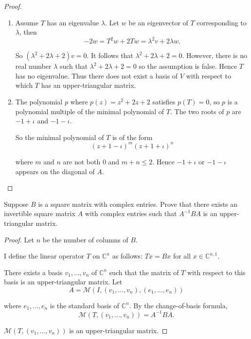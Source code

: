 \begin{proof}
    \begin{enumerate}[label={(\alph*)}]
        \item Assume $T$ has an eigenvalue $\lambda$. Let $w$ be an eigenvector of $T$ corresponding to $\lambda$, then
              \[
                  -2w = T^{2}w + 2Tw = \lambda^{2}v + 2\lambda w.
              \]

              So $(\lambda^{2} + 2\lambda + 2)v = 0$. It follows that $\lambda^{2} + 2\lambda + 2 = 0$. However, there is no real number $\lambda$ such that $\lambda^{2} + 2\lambda + 2 = 0$ so the assumption is false. Hence $T$ has no eigenvalue. Thus there does not exist a basis of $V$ with respect to which $T$ has an upper-triangular matrix.
        \item The polynomial $p$ where $p(z) = z^{2} + 2z + 2$ satisfies $p(T) = 0$, so $p$ is a polynomial multiple of the minimal polynomial of $T$. The two roots of $p$ are $-1+\iota$ and $-1-\iota$.

              So the minimal polynomial of $T$ is of the form
              \[
                  {(z + 1 - \iota)}^{m}{(z + 1 + \iota)}^{n}
              \]

              where $m$ and $n$ are not both $0$ and $m + n\leq 2$. Hence $-1 + \iota$ or $-1-\iota$ appears on the diagonal of $A$.
    \end{enumerate}
\end{proof}
\newpage

\begin{exercise}
    Suppose $B$ is a square matrix with complex entries. Prove that there exists an invertible square matrix $A$ with complex entries such that $A^{-1}BA$ is an upper-triangular matrix.
\end{exercise}

\begin{proof}
    Let $n$ be the number of columns of $B$.

    I define the linear operator $T$ on $\mathbb{C}^{n}$ as follows: $Tx = Bx$ for all $x\in\mathbb{C}^{n,1}$.

    There exists a basis $v_{1}, \ldots, v_{n}$ of $\mathbb{C}^{n}$ such that the matrix of $T$ with respect to this basis is an upper-triangular matrix. Let
    \[
        A = \mathcal{M}(I, (v_{1}, \ldots, v_{n}), (e_{1}, \ldots, e_{n}))
    \]

    where $e_{1}, \ldots, e_{n}$ is the standard basis of $\mathbb{C}^{n}$. By the change-of-basis formula,
    \[
        \mathcal{M}(T, (v_{1}, \ldots, v_{n})) = A^{-1}BA.
    \]

    $\mathcal{M}(T, (v_{1}, \ldots, v_{n}))$ is an upper-triangular matrix.
\end{proof}
\newpage

